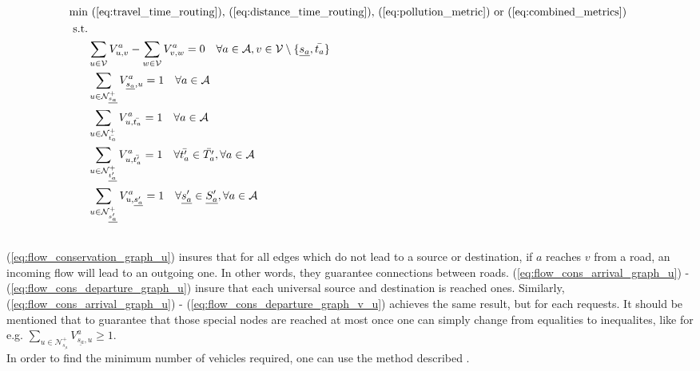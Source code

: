 \begin{align}
	\text{min}&  \text{
	(\ref{eq:travel_time_routing}), (\ref{eq:distance_time_routing}), (\ref{eq:pollution_metric}) or (\ref{eq:combined_metrics})
	}\nonumber\\
	\text{s.t.} &\nonumber\\
&\sum_{u \in \mathcal{V}} V^a_{u, v} - \sum_{w \in \mathcal{V}} V^a_{v, w} = 0 \quad \forall a \in \mathcal{A}, v \in \mathcal{V} \setminus \{\underline{s_a}, \bar{t_a}\} \label{eq:flow_conservation_graph_u} \\
&\sum_{ u \in \mathcal{N}^+_{\underline{s_a}} }V^a_{ \underline{s_a},u} = 1 \quad \forall a \in \mathcal{A} \label{eq:flow_cons_arrival_graph_u}\\
&\sum_{u \in \mathcal{N}^+_{\bar{t_a}} } V^a_{u, \bar{t_a}} = 1 \quad \forall a \in \mathcal{A} \label{eq:flow_cons_departure_graph_u}\\
&\sum_{u \in \mathcal{N}^+_{\underline{t'_a}} } V^a_{u, \bar{t'_a}} = 1 \quad \forall \bar{t'_a} \in \bar{T_a'}, \forall a \in \mathcal{A} 	\label{eq:flow_cons_arrival_graph_v_u}\\
&\sum_{u \in \mathcal{N}^+_{\underline{s'_a}} } V^a_{u, \underline{s'_a}} = 1 \quad \forall \underline{s'_a} \in \underline{S_a'}, \forall a \in \mathcal{A}\label{eq:flow_cons_departure_graph_v_u} \\
	\nonumber%
\end{align}
(\ref{eq:flow_conservation_graph_u}) insures that for all edges which do not lead to a source or destination, if $a$ reaches $v$ from a road, an incoming flow will lead to an outgoing one. In other words, they guarantee connections between roads. (\ref{eq:flow_cons_arrival_graph_u}) -  (\ref{eq:flow_cons_departure_graph_u}) insure that each universal source and destination is reached ones. Similarly, (\ref{eq:flow_cons_arrival_graph_u}) -  (\ref{eq:flow_cons_departure_graph_v_u}) achieves the same result, but for each requests.  It should be mentioned that to guarantee that those special nodes are reached at most once one can simply change from equalities to inequalites, like for e.g. $\sum_{ u \in \mathcal{N}^+_{\underline{s_a}} }V^a_{ \underline{s_a},u} \ge 1$.\\
In order to find the minimum number of vehicles required, one can use the method described . 
